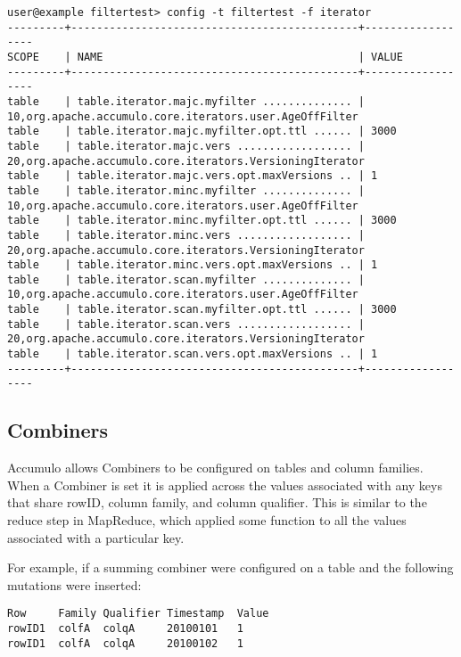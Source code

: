\begingroup\fontsize{8pt}{8pt}\selectfont\begin{verbatim}
user@example filtertest> config -t filtertest -f iterator
---------+---------------------------------------------+------------------
SCOPE    | NAME                                        | VALUE
---------+---------------------------------------------+------------------
table    | table.iterator.majc.myfilter .............. | 10,org.apache.accumulo.core.iterators.user.AgeOffFilter
table    | table.iterator.majc.myfilter.opt.ttl ...... | 3000
table    | table.iterator.majc.vers .................. | 20,org.apache.accumulo.core.iterators.VersioningIterator
table    | table.iterator.majc.vers.opt.maxVersions .. | 1
table    | table.iterator.minc.myfilter .............. | 10,org.apache.accumulo.core.iterators.user.AgeOffFilter
table    | table.iterator.minc.myfilter.opt.ttl ...... | 3000
table    | table.iterator.minc.vers .................. | 20,org.apache.accumulo.core.iterators.VersioningIterator
table    | table.iterator.minc.vers.opt.maxVersions .. | 1
table    | table.iterator.scan.myfilter .............. | 10,org.apache.accumulo.core.iterators.user.AgeOffFilter
table    | table.iterator.scan.myfilter.opt.ttl ...... | 3000
table    | table.iterator.scan.vers .................. | 20,org.apache.accumulo.core.iterators.VersioningIterator
table    | table.iterator.scan.vers.opt.maxVersions .. | 1
---------+---------------------------------------------+------------------
\end{verbatim}\endgroup

\subsection{Combiners}

Accumulo allows Combiners to be configured on tables and column
families. When a Combiner is set it is applied across the values
associated with any keys that share rowID, column family, and column qualifier.
This is similar to the reduce step in MapReduce, which applied some function to all
the values associated with a particular key.

For example, if a summing combiner were configured on a table and the following
mutations were inserted:

\begingroup\fontsize{8pt}{8pt}\selectfont\begin{verbatim}
Row     Family Qualifier Timestamp  Value
rowID1  colfA  colqA     20100101   1
rowID1  colfA  colqA     20100102   1
\end{verbatim}\endgroup

